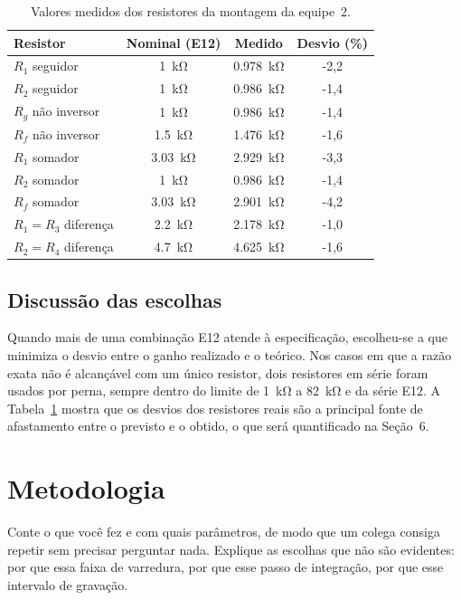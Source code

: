 \documentclass[11pt,a4paper]{article}
\begin{document}
\begin{table}[h]
\centering
\caption{Valores medidos dos resistores da montagem da equipe~2.}
\label{tab:medidos}
\begin{tabular}{lccc}
\hline
Resistor & Nominal (E12) & Medido & Desvio (\%) \\
\hline
$R_1$ seguidor & \SI{1}{\kilo\ohm} & \SI{0,978}{\kilo\ohm} & -2,2 \\
$R_2$ seguidor & \SI{1}{\kilo\ohm} & \SI{0,986}{\kilo\ohm} & -1,4 \\
$R_g$ não inversor & \SI{1}{\kilo\ohm} & \SI{0,986}{\kilo\ohm} & -1,4 \\
$R_f$ não inversor & \SI{1,5}{\kilo\ohm} & \SI{1,476}{\kilo\ohm} & -1,6 \\
$R_1$ somador & \SI{3,03}{\kilo\ohm} & \SI{2,929}{\kilo\ohm} & -3,3 \\
$R_2$ somador & \SI{1}{\kilo\ohm} & \SI{0,986}{\kilo\ohm} & -1,4 \\
$R_f$ somador & \SI{3,03}{\kilo\ohm} & \SI{2,901}{\kilo\ohm} & -4,2 \\
$R_1 = R_3$ diferença & \SI{2,2}{\kilo\ohm} & \SI{2,178}{\kilo\ohm} & -1,0 \\
$R_2 = R_4$ diferença & \SI{4,7}{\kilo\ohm} & \SI{4,625}{\kilo\ohm} & -1,6 \\
\hline
\end{tabular}
\end{table}

\subsection{Discussão das escolhas}

Quando mais de uma combinação E12 atende à especificação, escolheu-se a que minimiza o desvio entre o ganho realizado e o teórico. Nos casos em que a razão exata não é alcançável com um único resistor, dois resistores em série foram usados por perna, sempre dentro do limite de \SI{1}{\kilo\ohm} a \SI{82}{\kilo\ohm} e da série E12. A Tabela~\ref{tab:medidos} mostra que os desvios dos resistores reais são a principal fonte de afastamento entre o previsto e o obtido, o que será quantificado na Seção~6.

\section{Metodologia}

Conte o que você fez e com quais parâmetros, de modo que um colega consiga repetir sem
precisar perguntar nada. Explique as escolhas que não são evidentes: por que essa faixa de
varredura, por que esse passo de integração, por que esse intervalo de gravação.
\end{document}
